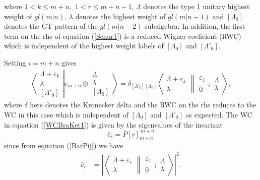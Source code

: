 \documentclass[12pt]{article}
\begin{document}
where $1 < k \leq m+n$,~$1 < r \leq m+n-1$, 
$\Lambda$ denotes the type 1 unitary highest weight of $gl(m|n)$, $\lambda$ denotes the highest weight of $gl(m|n-1)$ and $[\Lambda_0]$ denotes the GT pattern of the $gl(m|n-2)$ subalgebra. In addition, the first term on the rhs of equation (\ref{Schur1}) is a reduced Wigner coeficient (RWC) which is independent of the highest
weight labels of $[\Lambda_0]$ and $[\Lambda'_0]$.

Setting $i=m+n$ gives
\begin{align}
\left\langle\left. 
\begin{array}{c} \Lambda+\varepsilon_k\\ \lambda \\ {[\Lambda'_0]} \end{array}
\right|\right.
\left.
e_{m+n} \otimes \begin{array}{c} \Lambda \\ \lambda \\
{[\Lambda_0]} \end{array}
\right\rangle = \delta_{[\Lambda'_0][\Lambda_0]}
 \left\langle 
\begin{array}{c} \Lambda+\varepsilon_k\\ \lambda \end{array}
\right\rVert
\left.
\begin{array}{c} 
\varepsilon_1 \\ \dot{0}
\end{array}
;
\begin{array}{c} \Lambda \\ 
\lambda \end{array}
\right\rangle  , \label{WCBraKet1}
\end{align}
where $\delta$ here denotes the Kronecker delta and the RWC on the rhs reduces to the WC in this case which is independent of $[\Lambda_0]$ and $[\Lambda'_0]$ as expected. 
The WC in equation (\ref{WCBraKet1}) is given by the eigenvalues of the invariant
$$ 
\bar{c}_r = \bar{P}[r]_{m+n}^{\ m+n}
$$
since from equation (\ref{BarPij}) we have
\begin{align}
\bar{c}_r  &= \left| \left\langle 
\begin{array}{c} \Lambda+\varepsilon_r\\ \lambda \end{array}
\right\rVert
\left.
\begin{array}{c} \varepsilon_1 \\
\dot{0} \end{array} 
;
 \begin{array}{c} \Lambda \\
\lambda \end{array}
\right\rangle \right|^2. \label{WigCoefCBar}
\end{align}
\end{document}
